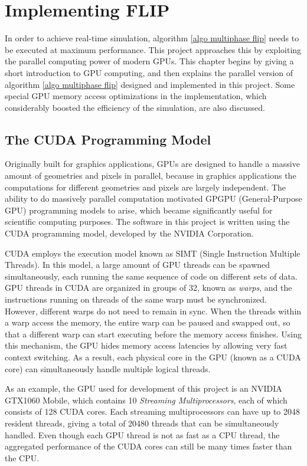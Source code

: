 


\chapter{Implementing FLIP}
\label{chapter flip impl}

In order to achieve real-time simulation, algorithm \ref{algo multiphase flip} needs to be executed at maximum performance. This project approaches this by exploiting the parallel computing power of modern GPUs. This chapter begins by giving a short introduction to GPU computing, and then explains the parallel version of algorithm \ref{algo multiphase flip} designed and implemented in this project. Some special GPU memory access optimizations in the implementation, which considerably boosted the efficiency of the simulation, are also discussed. 

\section{The CUDA Programming Model}

Originally built for graphics applications, GPUs are designed to handle a massive amount of geometries and pixels in parallel, because in graphics applications the computations for different geometries and pixels are largely independent. The ability to do massively parallel computation motivated GPGPU (General-Purpose GPU) programming models to arise, which became significantly useful for scientific computing purposes. The software in this project is written using the CUDA programming model, developed by the NVIDIA Corporation.

CUDA employs the execution model known as SIMT (Single Instruction Multiple Threads). In this model, a large amount of GPU threads can be spawned simultaneously, each running the same sequence of code on different sets of data. GPU threads in CUDA are organized in groups of 32, known as \textit{warps}, and the instructions running on threads of the same warp must be synchronized. However, different warps do not need to remain in sync. When the threads within a warp access the memory, the entire warp can be paused and swapped out, so that a different warp can start executing before the memory access finishes. Using this mechanism, the GPU hides memory access latencies by allowing very fast context switching. As a result, each physical core in the GPU (known as a CUDA core) can simultaneously handle multiple logical threads.

As an example, the GPU used for development of this project is an NVIDIA GTX1060 Mobile, which contains 10 \textit{Streaming Multiprocessors}, each of which consists of 128 CUDA cores. Each streaming multiprocessors can have up to 2048 resident threads, giving a total of 20480 threads that can be simultaneously handled. Even though each GPU thread is not as fast as a CPU thread, the aggregated performance of the CUDA cores can still be many times faster than the CPU.


